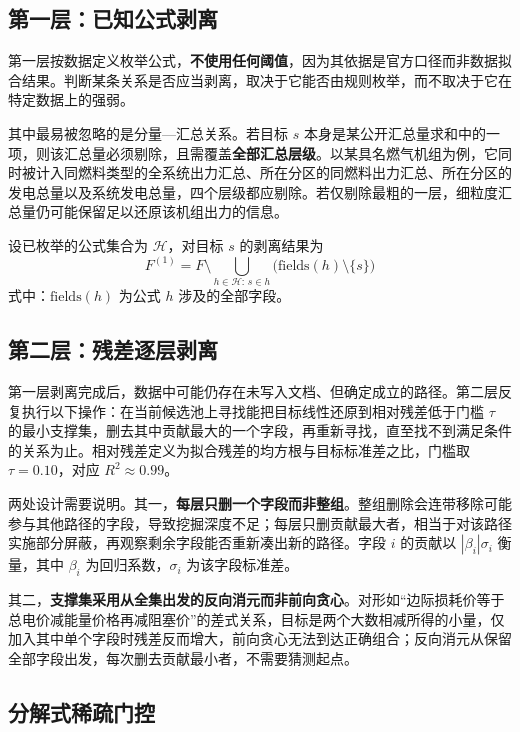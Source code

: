 \documentclass[UTF8,zihao=5,twoside]{ctexart}
\begin{document}
\subsection{第一层：已知公式剥离}

第一层按数据定义枚举公式，\textbf{不使用任何阈值}，因为其依据是官方口径而非数据拟合结果。判断某条关系是否应当剥离，取决于它能否由规则枚举，而不取决于它在特定数据上的强弱。

其中最易被忽略的是分量—汇总关系。若目标 $s$ 本身是某公开汇总量求和中的一项，则该汇总量必须剔除，且需覆盖\textbf{全部汇总层级}。以某具名燃气机组为例，它同时被计入同燃料类型的全系统出力汇总、所在分区的同燃料出力汇总、所在分区的发电总量以及系统发电总量，四个层级都应剔除。若仅剔除最粗的一层，细粒度汇总量仍可能保留足以还原该机组出力的信息。

设已枚举的公式集合为 $\mathcal{H}$，对目标 $s$ 的剥离结果为
\begin{equation}
F^{(1)}=F\setminus\bigcup_{h\in\mathcal{H}:\,s\in h}\big(\mathrm{fields}(h)\setminus\{s\}\big)
\end{equation}
式中：$\mathrm{fields}(h)$ 为公式 $h$ 涉及的全部字段。

\subsection{第二层：残差逐层剥离}

第一层剥离完成后，数据中可能仍存在未写入文档、但确定成立的路径。第二层反复执行以下操作：在当前候选池上寻找能把目标线性还原到相对残差低于门槛 $\tau$ 的最小支撑集，删去其中贡献最大的一个字段，再重新寻找，直至找不到满足条件的关系为止。相对残差定义为拟合残差的均方根与目标标准差之比，门槛取 $\tau=0.10$，对应 $R^2\approx0.99$。

两处设计需要说明。其一，\textbf{每层只删一个字段而非整组}。整组删除会连带移除可能参与其他路径的字段，导致挖掘深度不足；每层只删贡献最大者，相当于对该路径实施部分屏蔽，再观察剩余字段能否重新凑出新的路径。字段 $i$ 的贡献以 $|\beta_i|\sigma_i$ 衡量，其中 $\beta_i$ 为回归系数，$\sigma_i$ 为该字段标准差。

其二，\textbf{支撑集采用从全集出发的反向消元而非前向贪心}。对形如“边际损耗价等于总电价减能量价格再减阻塞价”的差式关系，目标是两个大数相减所得的小量，仅加入其中单个字段时残差反而增大，前向贪心无法到达正确组合；反向消元从保留全部字段出发，每次删去贡献最小者，不需要猜测起点。

\subsection{分解式稀疏门控}
\end{document}
